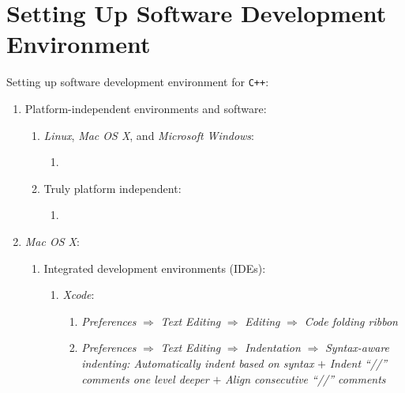 \section{Setting Up Software Development Environment}
\label{sec:SettingUpSoftwareDevelopmentEnvironment}

Setting up software development environment for {\tt C++}: \vspace{-0.3cm}
\begin{enumerate} \itemsep -4pt
\item Platform-independent environments and software: \vspace{-0.3cm}
	\begin{enumerate} \itemsep -2pt
	\item {\it Linux}, {\it Mac OS X}, and {\it Microsoft Windows}: \vspace{-0.2cm}
		\begin{enumerate} \itemsep -2pt
		\item 
		\end{enumerate}
	\item Truly platform independent: \vspace{-0.2cm}
		\begin{enumerate} \itemsep -2pt
		\item 
		\end{enumerate}
	\end{enumerate}
\item {\it Mac OS X}: \vspace{-0.3cm}
	\begin{enumerate} \itemsep -2pt
	\item Integrated development environments (IDEs): \vspace{-0.2cm}
		\begin{enumerate} \itemsep -2pt
		\item {\it Xcode}: \vspace{-0.1cm}
			\begin{enumerate} \itemsep -1pt
			\item {\it Preferences} $\Longrightarrow$ {\it Text Editing} $\Longrightarrow$ {\it Editing} $\Longrightarrow$ {\it Code folding ribbon}
			\item {\it Preferences} $\Longrightarrow$ {\it Text Editing} $\Longrightarrow$ {\it Indentation} $\Longrightarrow$ {\it Syntax-aware indenting: Automatically indent based on syntax} $+$ {\it Indent ``//'' comments one level deeper} $+$ {\it Align consecutive ``//'' comments}
			\end{enumerate}

\end{enumerate}
\end{enumerate}
\end{enumerate}

